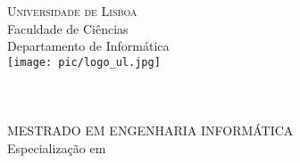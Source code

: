 
\pagestyle{empty}

\begin{center}
\vspace{3cm}\normalfont\normalfont
\textsc{\huge{Universidade de Lisboa}}\\
\LARGE{Faculdade de Ci\^{e}ncias}\\
\Large{Departamento de Inform\'{a}tica}\\
\vspace{1cm}
\texttt{[image: pic/logo\_ul.jpg]}\\

\vspace{2cm}
\PEIIdiomaTese
\Large{\bf \PEITITULO}\\
\vspace{1cm}
\vspace{0.7cm}
\vspace{0.7cm}
\Large{\bf \PEIAutor}\\
\vspace{2.4cm}
\Large{\bf \PEITIPO}\\
\vfill
\Large{MESTRADO EM ENGENHARIA INFORM\'{A}TICA}\\
\large{Especializa\c{c}\~{a}o em \MEIEspecializacao}\\
\vfill
\PEIAno
\end{center}
\newpage
\mbox{}
\newpage

\setcounter{page}{1}


